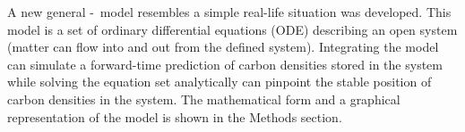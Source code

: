 \documentclass[../thesis.tex]{subfiles} %
\begin{document}

A new general \phy-\bac\ model resembles a simple real-life situation was developed.  This model is a set of ordinary differential equations (ODE) describing an open system (matter can flow into and out from the defined system).  Integrating the model can simulate a forward-time prediction of carbon densities stored in the system while solving the equation set analytically can pinpoint the stable position of carbon densities in the system.  The mathematical form and a graphical representation of the model is shown in the Methods section.
\end{document}
